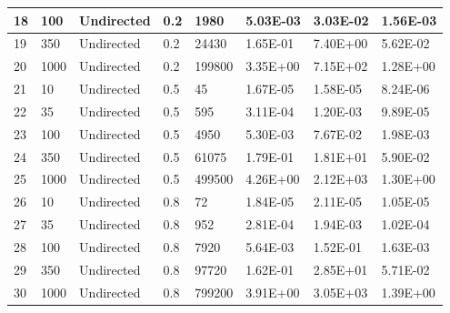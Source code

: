 \documentclass[runningheads]{llncs}
\begin{document}
\begin{table}[!ht]
\begin{tabular}{|l|l|l|l|l|l|l|l|}
        18 & 100 & Undirected & 0.2 & 1980 & 5.03E-03 & 3.03E-02 & 1.56E-03 \\ \hline
        19 & 350 & Undirected & 0.2 & 24430 & 1.65E-01 & 7.40E+00 & 5.62E-02 \\ \hline
        20 & 1000 & Undirected & 0.2 & 199800 & 3.35E+00 & 7.15E+02 & 1.28E+00 \\ \hline
        21 & 10 & Undirected & 0.5 & 45 & 1.67E-05 & 1.58E-05 & 8.24E-06 \\ \hline
        22 & 35 & Undirected & 0.5 & 595 & 3.11E-04 & 1.20E-03 & 9.89E-05 \\ \hline
        23 & 100 & Undirected & 0.5 & 4950 & 5.30E-03 & 7.67E-02 & 1.98E-03 \\ \hline
        24 & 350 & Undirected & 0.5 & 61075 & 1.79E-01 & 1.81E+01 & 5.90E-02 \\ \hline
        25 & 1000 & Undirected & 0.5 & 499500 & 4.26E+00 & 2.12E+03 & 1.30E+00 \\ \hline
        26 & 10 & Undirected & 0.8 & 72 & 1.84E-05 & 2.11E-05 & 1.05E-05 \\ \hline
        27 & 35 & Undirected & 0.8 & 952 & 2.81E-04 & 1.94E-03 & 1.02E-04 \\ \hline
        28 & 100 & Undirected & 0.8 & 7920 & 5.64E-03 & 1.52E-01 & 1.63E-03 \\ \hline
        29 & 350 & Undirected & 0.8 & 97720 & 1.62E-01 & 2.85E+01 & 5.71E-02 \\ \hline
        30 & 1000 & Undirected & 0.8 & 799200 & 3.91E+00 & 3.05E+03 & 1.39E+00 \\ \hline
    \end{tabular}
    \label{Table 2}
\end{table}
\end{document}

